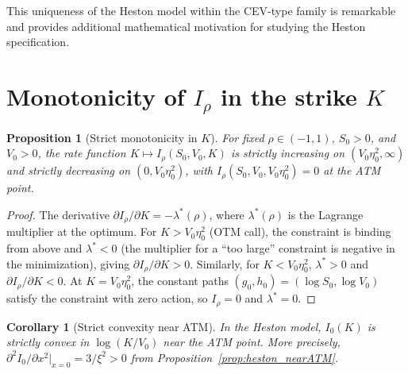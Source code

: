 \documentclass[11pt]{article}
\newtheorem{proposition}[theorem]{Proposition}
\newtheorem{corollary}[theorem]{Corollary}
\theoremstyle{definition}
\begin{document}
This uniqueness of the Heston model within the CEV-type family is remarkable and provides additional mathematical motivation for studying the Heston specification.

\section{Monotonicity of $I_\rho$ in the strike $K$}\label{app:monotonicity}

\begin{proposition}[Strict monotonicity in $K$]\label{prop:monotone_K}
For fixed $\rho \in (-1,1)$, $S_0 > 0$, and $V_0 > 0$, the rate function $K \mapsto I_\rho(S_0, V_0, K)$ is strictly increasing on $(V_0\eta_0^2, \infty)$ and strictly decreasing on $(0, V_0\eta_0^2)$, with $I_\rho(S_0, V_0, V_0\eta_0^2) = 0$ at the ATM point.
\end{proposition}

\begin{proof}
The derivative $\partial I_\rho/\partial K = -\lambda^*(\rho)$, where $\lambda^*(\rho)$ is the Lagrange multiplier at the optimum. For $K > V_0\eta_0^2$ (OTM call), the constraint is binding from above and $\lambda^* < 0$ (the multiplier for a ``too large'' constraint is negative in the minimization), giving $\partial I_\rho/\partial K > 0$. Similarly, for $K < V_0\eta_0^2$, $\lambda^* > 0$ and $\partial I_\rho/\partial K < 0$. At $K = V_0\eta_0^2$, the constant paths $(g_0, h_0) = (\log S_0, \log V_0)$ satisfy the constraint with zero action, so $I_\rho = 0$ and $\lambda^* = 0$.
\end{proof}

\begin{corollary}[Strict convexity near ATM]\label{cor:convex_ATM}
In the Heston model, $I_0(K)$ is strictly convex in $\log(K/V_0)$ near the ATM point. More precisely, $\partial^2 I_0/\partial x^2|_{x=0} = 3/\xi^2 > 0$ from Proposition~\ref{prop:heston_nearATM}.
\end{corollary}
\end{document}
